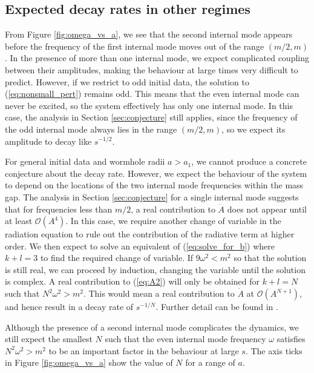 \subsection{Expected decay rates in other regimes}
From Figure \ref{fig:omega_vs_a}, we see that the second internal mode appears before the frequency of the first internal mode moves out of the range $(m/2,m)$. In the presence of more than one internal mode, we expect complicated coupling between their amplitudes, making the behaviour at large times very difficult to predict. However, if we restrict to odd initial data, the solution to (\ref{eq:nonsmall_pert}) remains odd. This means that the even internal mode can never be excited, so the system effectively has only one internal mode. In this case, the analysis in Section \ref{sec:conjecture} still applies, since the frequency of the odd internal mode always lies in the range $(m/2,m)$, so we expect its amplitude to decay like $s^{-1/2}$.

For general initial data and wormhole radii $a>a_1$, we cannot produce a concrete conjecture about the decay rate. However, we expect the behaviour of the system to depend on the locations of the two internal mode frequencies within the mass gap. The analysis in Section \ref{sec:conjecture} for a single internal mode suggests that for frequencies less than $m/2$, a real contribution to $\dot{A}$ does not appear until at least $\mathcal{O}(A^4)$. In this case, we require another change of variable in the radiation equation to rule out the contribution of the radiative term at higher order. We then expect to solve an equivalent of (\ref{eq:solve_for_b}) where $k+l=3$ to find the required change of variable. If $9\omega^2<m^2$ so that the solution is still real, we can proceed by induction, changing the variable until the solution is complex. A real contribution to (\ref{eq:A2}) will only be obtained for $k+l=N$ such that $N^2\omega^2>m^2$. This would mean a real contribution to $\dot{A}$ at $\mathcal{O}(A^{N+1})$, and hence result in a decay rate of $s^{-1/N}$. Further detail can be found in \cite{SG}.

Although the presence of a second internal mode complicates the dynamics, we still expect the smallest $N$ such that the even internal mode frequency $\omega$ satisfies $N^2\omega^2>m^2$ to be an important factor in the behaviour at large $s$. The axis ticks in Figure \ref{fig:omega_vs_a} show the value of $N$ for a range of $a$.

 



